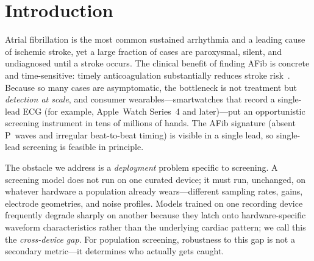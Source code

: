 \documentclass[]{ws-procs9x6}
\begin{document}

\bodymatter
\section{Introduction}
Atrial fibrillation is the most common sustained arrhythmia and a leading cause
of ischemic stroke, yet a large fraction of cases are paroxysmal, silent, and
undiagnosed until a stroke occurs. The clinical benefit of finding AFib is
concrete and time-sensitive: timely anticoagulation substantially reduces stroke
risk~\cite{perez2019appleheart}. Because so many cases are asymptomatic, the
bottleneck is not treatment but \emph{detection at scale}, and consumer
wearables---smartwatches that record a single-lead ECG (for example, Apple~Watch
Series~4 and later)---put an opportunistic screening instrument in tens of
millions of hands. The AFib signature (absent P~waves and irregular beat-to-beat
timing) is visible in a single lead, so single-lead screening is feasible in
principle.

The obstacle we address is a \emph{deployment} problem specific to screening.
A screening model does not run on one curated device; it must run, unchanged, on
whatever hardware a population already wears---different sampling rates, gains,
electrode geometries, and noise profiles. Models trained on one recording device
frequently degrade sharply on another because they latch onto hardware-specific
waveform characteristics rather than the underlying cardiac pattern; we call this
the \emph{cross-device gap}. For population screening, robustness to this gap is
not a secondary metric---it determines who actually gets caught.
\end{document}
